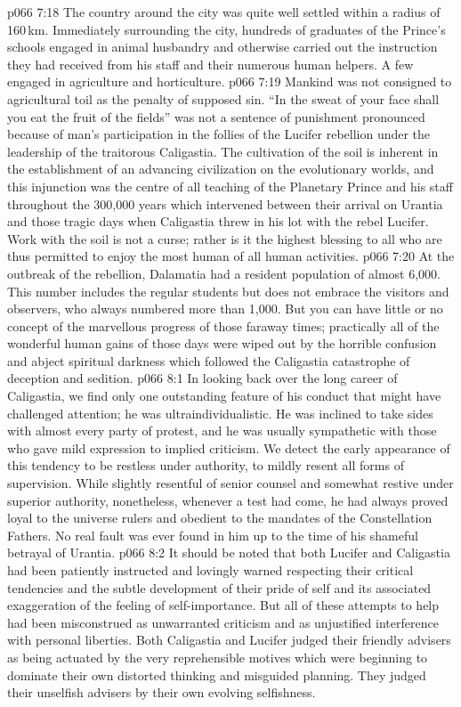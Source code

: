 \vs p066 7:18 \pc The country around the city was quite well settled within a radius of 160\,km. Immediately surrounding the city, hundreds of graduates of the Prince’s schools engaged in animal husbandry and otherwise carried out the instruction they had received from his staff and their numerous human helpers. A few engaged in agriculture and horticulture.
\vs p066 7:19 Mankind was not consigned to agricultural toil as the penalty of supposed sin. “In the sweat of your face shall you eat the fruit of the fields” was not a sentence of punishment pronounced because of man’s participation in the follies of the Lucifer rebellion under the leadership of the traitorous Caligastia. The cultivation of the soil is inherent in the establishment of an advancing civilization on the evolutionary worlds, and this injunction was the centre of all teaching of the Planetary Prince and his staff throughout the 300,000 years which intervened between their arrival on Urantia and those tragic days when Caligastia threw in his lot with the rebel Lucifer. Work with the soil is not a curse; rather is it the highest blessing to all who are thus permitted to enjoy the most human of all human activities.
\vs p066 7:20 At the outbreak of the rebellion, Dalamatia had a resident population of almost 6,000. This number includes the regular students but does not embrace the visitors and observers, who always numbered more than 1,000. But you can have little or no concept of the marvellous progress of those faraway times; practically all of the wonderful human gains of those days were wiped out by the horrible confusion and abject spiritual darkness which followed the Caligastia catastrophe of deception and sedition.
\vs p066 8:1 In looking back over the long career of Caligastia, we find only one outstanding feature of his conduct that might have challenged attention; he was ultraindividualistic. He was inclined to take sides with almost every party of protest, and he was usually sympathetic with those who gave mild expression to implied criticism. We detect the early appearance of this tendency to be restless under authority, to mildly resent all forms of supervision. While slightly resentful of senior counsel and somewhat restive under superior authority, nonetheless, whenever a test had come, he had always proved loyal to the universe rulers and obedient to the mandates of the Constellation Fathers. No real fault was ever found in him up to the time of his shameful betrayal of Urantia.
\vs p066 8:2 It should be noted that both Lucifer and Caligastia had been patiently instructed and lovingly warned respecting their critical tendencies and the subtle development of their pride of self and its associated exaggeration of the feeling of self\hyp{}importance. But all of these attempts to help had been misconstrued as unwarranted criticism and as unjustified interference with personal liberties. Both Caligastia and Lucifer judged their friendly advisers as being actuated by the very reprehensible motives which were beginning to dominate their own distorted thinking and misguided planning. They judged their unselfish advisers by their own evolving selfishness.
